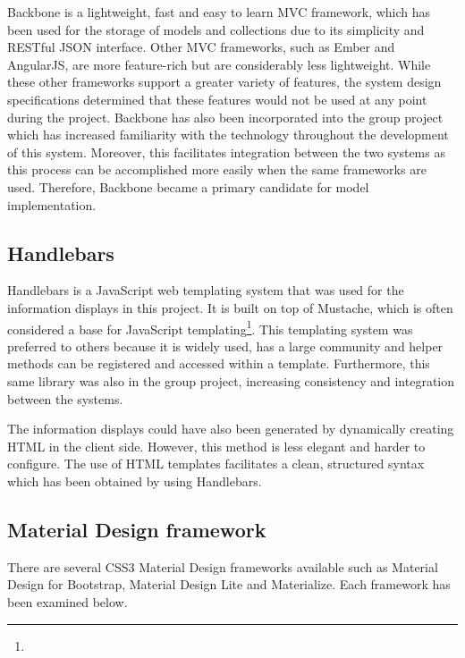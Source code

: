 {{		Backbone is a lightweight, fast and easy to learn MVC framework, which has been used for the storage of models and collections due to its simplicity and RESTful JSON interface. Other MVC frameworks, such as Ember and AngularJS, are more feature-rich but are considerably less lightweight. While these other frameworks support a greater variety of features, the system design specifications determined that these features would not be used at any point during the project. Backbone has also been incorporated into the group project which has increased familiarity with the technology throughout the development of this system. Moreover, this facilitates integration between the two systems as this process can be accomplished more easily when the same frameworks are used. Therefore, Backbone became a primary candidate for model implementation.

	}

	\subsection{Handlebars} {
	\label{sec:handlebars}

		Handlebars is a JavaScript web templating system that was used for the information displays in this project. It is built on top of Mustache, which is often considered a base for JavaScript templating\footnote{}. This templating system was preferred to others because it is widely used, has a large community and helper methods can be registered and accessed within a template. Furthermore, this same library was also in the group project, increasing consistency and integration between the systems.

		The information displays could have also been generated by dynamically creating HTML in the client side. However, this method is less elegant and harder to configure. The use of HTML templates facilitates a clean, structured syntax which has been obtained by using Handlebars.

	}

	\subsection{Material Design framework} {
	\label{sec:material_design_framework}

		There are several CSS3 Material Design frameworks available such as Material Design for Bootstrap, Material Design Lite and Materialize. Each framework has been examined below.

}}
